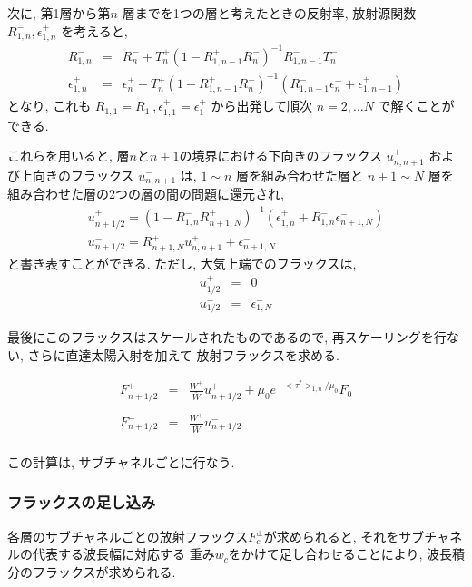 次に, 第1層から第$n$ 層までを1つの層と考えたときの反射率, 放射源関数
$R^-_{1,n}, \epsilon^+_{1,n}$ を考えると,
\begin{eqnarray}
  R^-_{1,n} & = & R^-_n 
      + T^+_n ( 1- R^+_{1,n-1} R^-_n )^{-1} R^-_{1,n-1} T^-_n \\
  \epsilon^+_{1,n} & = & \epsilon^+_n
    + T^+_n ( 1- R^+_{1,n-1} R^-_n )^{-1} 
      ( R^-_{1,n-1} \epsilon^-_n + \epsilon^+_{1,n-1} ) 
\end{eqnarray}
となり, これも $R^-_{1,1} = R^-_1, \epsilon^+_{1,1} = \epsilon^+_1$
から出発して順次 $n=2, \ldots N$ で解くことができる.

これらを用いると,
層$n$と$n+1$の境界における下向きのフラックス $u^+_{n,n+1}$
および上向きのフラックス $u^-_{n,n+1}$ は,
$1\sim n$ 層を組み合わせた層と
$n+1\sim N$ 層を組み合わせた層の2つの層の間の問題に還元され,
\begin{eqnarray}
 u^+_{n+1/2} = (1-R^-_{1,n} R^+_{n+1,N})^{-1}
    (\epsilon^+_{1,n} + R^-_{1,n} \epsilon^-_{n+1,N} ) \\
 u^-_{n+1/2} = R^+_{n+1,N}  u^+_{n,n+1} + \epsilon^-_{n+1,N}
\end{eqnarray}
と書き表すことができる.
ただし, 大気上端でのフラックスは,
\begin{eqnarray}
 u^+_{1/2} & = & 0 \\
 u^-_{1/2} & = & \epsilon^-_{1,N}
\end{eqnarray}

最後にこのフラックスはスケールされたものであるので,
再スケーリングを行ない, さらに直達太陽入射を加えて
放射フラックスを求める.

\begin{eqnarray}
  F^+_{n+1/2} & = & \frac{W^+}{\bar{W}} u^+_{n+1/2} 
                + \mu_0 e^{-<\tau^*>_{1,n}/\mu_0} F_0 \\\\
  F^-_{n+1/2} & = & \frac{W^+}{\bar{W}} u^-_{n+1/2} \\
\end{eqnarray}

この計算は, サブチャネルごとに行なう.

\subsubsection{フラックスの足し込み}

各層のサブチャネルごとの放射フラックス$F^\pm_c$が求められると,
それをサブチャネルの代表する波長幅に対応する
重み$w_c$をかけて足し合わせることにより,
波長積分のフラックスが求められる.

